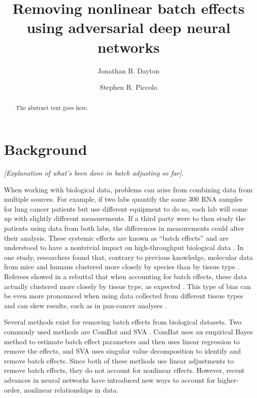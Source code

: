 \documentclass[notitlepage]{article}
\begin{document}
\title{Removing nonlinear batch effects using adversarial deep neural networks}
\author[1]{Jonathan B. Dayton}
\author[1]{Stephen R. Piccolo}
\date{}

\maketitle

\begin{abstract}
	The abstract text goes here.
\end{abstract}

\section{Background}

\emph{[Explanation of what's been done in batch adjusting so far].}

When working with biological data, problems can arise from combining data from multiple sources.
For example, if two labs quantify the same 300 RNA samples for lung cancer patients but use different equipment to do so, each lab will come up with slightly different measurements.
If a third party were to then study the patients using data from both labs, the differences in measurements could alter their analysis.
These systemic effects are known as ``batch effects'' and are understood to have a nontrivial impact on high-throughput biological data \citep{leek_tackling_2010}.
In one study, researchers found that, contrary to previous knowledge, molecular data from mice and humans clustered more closely by species than by tissue type \citep{yue_comparative_2014}.
Referees showed in a rebuttal that when accounting for batch effects, these data actually clustered more closely by tissue type, as expected \citep{gilad_reanalysis_2015}.
This type of bias can be even more pronounced when using data collected from different tissue types and can skew results, such as in pan-cancer analyses \citep{dayton_classifying_2017}.

Several methods exist for removing batch effects from biological datasets.
Two commonly used methods are ComBat \citep{johnson_adjusting_2007} and SVA \citep{leek_capturing_2007}.
ComBat uses an empirical Bayes method to estimate batch effect parameters and then uses linear regression to remove the effects, and SVA uses singular value decomposition to identify and remove batch effects.
Since both of these methods use linear adjustments to remove batch effects, they do not account for nonlinear effects.
However, recent advances in neural networks have introduced new ways to account for higher-order, nonlinear relationships in data.
\end{document}
